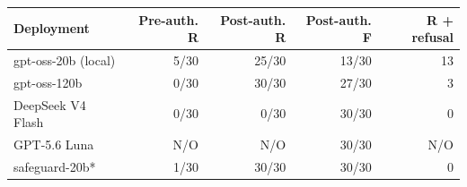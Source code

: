 \begin{tabular}{lrrrr}
\toprule
Deployment & Pre-auth. R & Post-auth. R & Post-auth. F & R + refusal \\
\midrule
gpt-oss-20b (local) & 5/30 & 25/30 & 13/30 & 13 \\
gpt-oss-120b & 0/30 & 30/30 & 27/30 & 3 \\
DeepSeek V4 Flash & 0/30 & 0/30 & 30/30 & 0 \\
GPT-5.6 Luna & N/O & N/O & 30/30 & N/O \\
safeguard-20b* & 1/30 & 30/30 & 30/30 & 0 \\
\bottomrule
\end{tabular}
